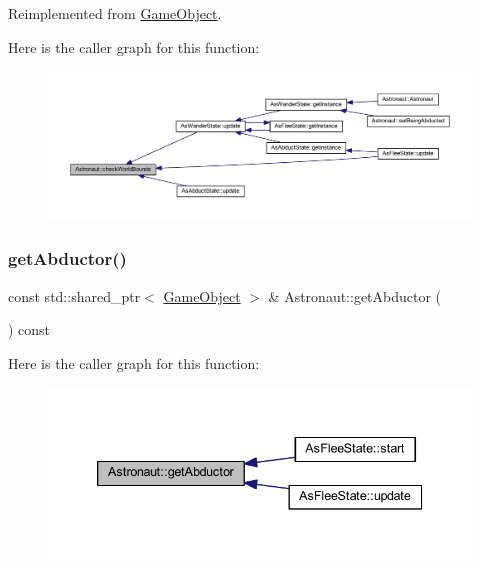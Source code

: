 Reimplemented from \hyperlink{class_game_object_a07bcaf0d87bd507f0a6e98abebd70e53}{Game\+Object}.

Here is the caller graph for this function\+:
\nopagebreak
\begin{figure}[H]
\begin{center}
\leavevmode
\includegraphics[width=350pt]{class_astronaut_a362cf11f645801a8067efaa1f9310e4c_icgraph}
\end{center}
\end{figure}
\mbox{\label{class_astronaut_ac09116dc65723515d6bcf4bd81a8fcb2}} 
\subsubsection{\texorpdfstring{get\+Abductor()}{getAbductor()}}
{\footnotesize\ttfamily const std\+::shared\+\_\+ptr$<$ \hyperlink{class_game_object}{Game\+Object} $>$ \& Astronaut\+::get\+Abductor (\begin{DoxyParamCaption}{ }\end{DoxyParamCaption}) const}

Here is the caller graph for this function\+:
\nopagebreak
\begin{figure}[H]
\begin{center}
\leavevmode
\includegraphics[width=339pt]{class_astronaut_ac09116dc65723515d6bcf4bd81a8fcb2_icgraph}
\end{center}
\end{figure}
\mbox{\label{class_astronaut_af372531d99d29adf03595c0a7922ce42}} 
